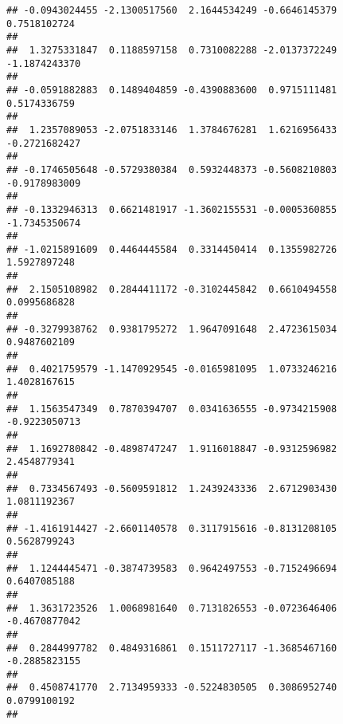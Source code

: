 \documentclass[]{article}
\begin{document}
\begin{verbatim}
## -0.0943024455 -2.1300517560  2.1644534249 -0.6646145379  0.7518102724 
##                                                                       
##  1.3275331847  0.1188597158  0.7310082288 -2.0137372249 -1.1874243370 
##                                                                       
## -0.0591882883  0.1489404859 -0.4390883600  0.9715111481  0.5174336759 
##                                                                       
##  1.2357089053 -2.0751833146  1.3784676281  1.6216956433 -0.2721682427 
##                                                                       
## -0.1746505648 -0.5729380384  0.5932448373 -0.5608210803 -0.9178983009 
##                                                                       
## -0.1332946313  0.6621481917 -1.3602155531 -0.0005360855 -1.7345350674 
##                                                                       
## -1.0215891609  0.4464445584  0.3314450414  0.1355982726  1.5927897248 
##                                                                       
##  2.1505108982  0.2844411172 -0.3102445842  0.6610494558  0.0995686828 
##                                                                       
## -0.3279938762  0.9381795272  1.9647091648  2.4723615034  0.9487602109 
##                                                                       
##  0.4021759579 -1.1470929545 -0.0165981095  1.0733246216  1.4028167615 
##                                                                       
##  1.1563547349  0.7870394707  0.0341636555 -0.9734215908 -0.9223050713 
##                                                                       
##  1.1692780842 -0.4898747247  1.9116018847 -0.9312596982  2.4548779341 
##                                                                       
##  0.7334567493 -0.5609591812  1.2439243336  2.6712903430  1.0811192367 
##                                                                       
## -1.4161914427 -2.6601140578  0.3117915616 -0.8131208105  0.5628799243 
##                                                                       
##  1.1244445471 -0.3874739583  0.9642497553 -0.7152496694  0.6407085188 
##                                                                       
##  1.3631723526  1.0068981640  0.7131826553 -0.0723646406 -0.4670877042 
##                                                                       
##  0.2844997782  0.4849316861  0.1511727117 -1.3685467160 -0.2885823155 
##                                                                       
##  0.4508741770  2.7134959333 -0.5224830505  0.3086952740  0.0799100192 
##                                                                       

\end{verbatim}
\end{document}
